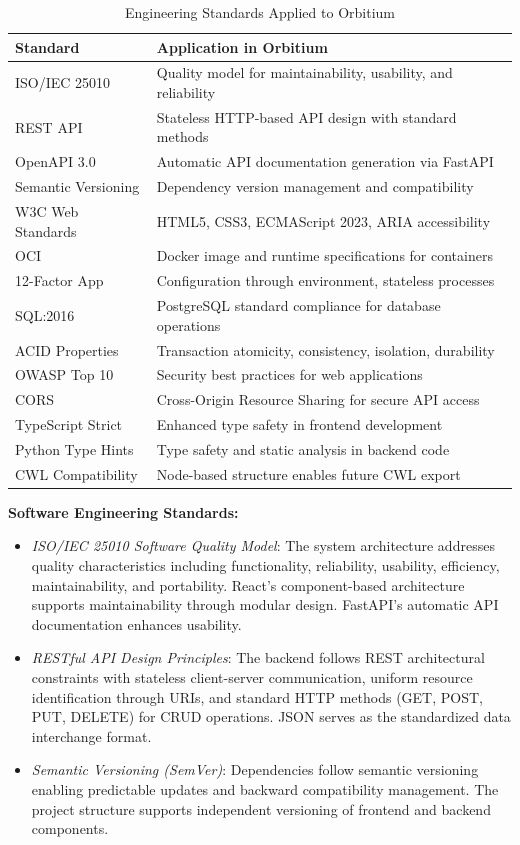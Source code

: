 \documentclass[12pt]{article}
\begin{document}
\begin{table}[h]
\centering
\caption{Engineering Standards Applied to Orbitium}
\label{tab:engineering_standards}
\begin{tabular}{|l|p{9cm}|}
\hline
\textbf{Standard} & \textbf{Application in Orbitium} \\
\hline
ISO/IEC 25010 & Quality model for maintainability, usability, and reliability \\
REST API & Stateless HTTP-based API design with standard methods \\
OpenAPI 3.0 & Automatic API documentation generation via FastAPI \\
Semantic Versioning & Dependency version management and compatibility \\
W3C Web Standards & HTML5, CSS3, ECMAScript 2023, ARIA accessibility \\
OCI & Docker image and runtime specifications for containers \\
12-Factor App & Configuration through environment, stateless processes \\
SQL:2016 & PostgreSQL standard compliance for database operations \\
ACID Properties & Transaction atomicity, consistency, isolation, durability \\
OWASP Top 10 & Security best practices for web applications \\
CORS & Cross-Origin Resource Sharing for secure API access \\
TypeScript Strict & Enhanced type safety in frontend development \\
Python Type Hints & Type safety and static analysis in backend code \\
CWL Compatibility & Node-based structure enables future CWL export \\
\hline
\end{tabular}
\end{table}

\textbf{Software Engineering Standards:}
\begin{itemize}
    \item \textit{ISO/IEC 25010 Software Quality Model}: The system architecture addresses quality characteristics including functionality, reliability, usability, efficiency, maintainability, and portability. React's component-based architecture supports maintainability through modular design. FastAPI's automatic API documentation enhances usability.
    
    \item \textit{RESTful API Design Principles}: The backend follows REST architectural constraints with stateless client-server communication, uniform resource identification through URIs, and standard HTTP methods (GET, POST, PUT, DELETE) for CRUD operations. JSON serves as the standardized data interchange format.
    
    \item \textit{Semantic Versioning (SemVer)}: Dependencies follow semantic versioning enabling predictable updates and backward compatibility management. The project structure supports independent versioning of frontend and backend components.
\end{itemize}
\end{document}
